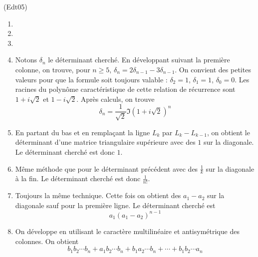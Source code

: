 \begin{tiny}(Edt05)\end{tiny}
\begin{enumerate}
 \item 
 \item
 \item
 \item Notons $\delta_n$ le déterminant cherché. En développant suivant la première colonne, on trouve, pour $n\geq 5$, $\delta_n=2\delta_{n-1}-3\delta_{n-1}$. On convient des petites valeurs pour que la formule soit toujours valable : $\delta_2=1$, $\delta_1=1$, $\delta_0=0$. Les racines du polynôme caractéristique de cette relation de récurrence sont $1+i\sqrt{2}$ et $1-i\sqrt{2}$. Après calculs, on trouve
\begin{displaymath}
 \delta_n = \frac{1}{\sqrt{2}}\Im(1+i\sqrt{2})^n
\end{displaymath}
\item En partant du bas et en remplaçant la ligne $L_k$ par $L_k - L_{k-1}$, on obtient le déterminant d'une matrice triangulaire supérieure avec des $1$ sur la diagonale. Le déterminant cherché est donc $1$.
\item Même méthode que pour le déterminant précédent avec des $\frac{1}{k}$ sur la diagonale à la fin. Le déterminant cherché est donc $\frac{1}{n!}$.
\item Toujours la même technique. Cette fois on obtient des $a_1 - a_2$ sur la diagonale sauf pour la première ligne. Le déterminant cherché est
\begin{displaymath}
 a_1(a_1 - a_2)^{n-1}
\end{displaymath}
 \item On développe en utilisant le caractère multilinéaire et antisymétrique des colonnes. On obtient
\begin{displaymath}
 b_1b_2\cdots b_n + a_1b_2\cdots b_n+ b_1a_2\cdots b_n + \cdots + b_1b_2\cdots a_n
\end{displaymath}

\end{enumerate}
